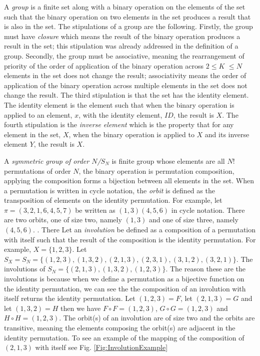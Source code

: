 A \emph{group} is a finite set along with a binary operation on the elements of the set such that the binary operation on two elements in the set 
produces a result that is also in the set. The stipulations of a group are the following. Firstly, the group must have \emph{closure} which means the 
result of the binary operation produces a result in the set; this stipulation was already addressed in the definition of a group. Secondly, the group must 
be associative, meaning the rearrangement of priority of the order of application of the binary operation across $2 \leq K$ $\leq N$ elements in the set 
does not change the result; associativity means the order of application of the binary operation across multiple elements in the set does not change the result. The third stipulation 
is that the set has the identity element. The identity element is the element such that when the binary operation is applied to an element, $x$, with the identity element, $ID$, 
the result is $X$. The fourth stipulation is the \emph{inverse element} which is the property that for any element in the set, $X$, when the binary operation is applied to $X$ and 
its inverse element $Y$, 
the result is $X$.\cite{A14}\par 

A \emph{symmetric group of order $N$/$S_{N}$} is finite group whose elements are all $N!$ permutations of order $N$, the binary operation 
is permutation composition, applying the composition forms a bijection between all elements in the set. When a permutation is written in 
cycle notation, the \emph{orbit} is defined as the transposition of elements on the identity permutation. For example, 
let $\pi=(3,2,1,6,4,5,7)$ be written as $(1,3)(4,5,6)$ in cycle notation. There are two orbits, one of size two, namely $(1,3)$ and 
one of size three, namely $(4,5,6)$. \cite{A15}. There Let an \emph{involution} 
be defined as a composition of a permutation with itself such that the result of the composition is the identity permutation. \cite{A13} 
For example, $X=\{1, 2, 3\}$. Let $S_{X} = S_{N} = \{(1,2,3),(1,3,2),(2,1,3),(2,3,1),(3,1,2),(3,2,1)\}$. The involutions of $S_{N}=\{(2,1,3),(1,3,2),(1,2,3)\}$.
The reason these are the involutions is because when we define a permutation as a bijective function on the identity permutation, we can see the the composition 
of an involution with itself returns the identity permutation. Let $(1,2,3)=F$, let $(2,1,3)=G$ and let $(1,3,2)=H$ then we have $F \circ F=(1,2,3)$,
$G \circ G = (1,2,3)$ and $H \circ H=(1,2,3)$. The orbit(s) of an involution are of size two and 
the orbits are transitive, meaning the elements composing the orbit(s) are adjacent in the identity permutation.
To see an example of the mapping of the composition of $(2,1,3)$ with itself see Fig. \ref{Fig:InvolutionExample}\newline 


